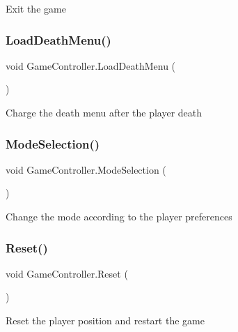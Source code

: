 Exit the game \mbox{\label{class_game_controller_ad6e73ede9ce6222e8cfd5369ef87b04e}} 
\subsubsection{\texorpdfstring{Load\+Death\+Menu()}{LoadDeathMenu()}}
{\footnotesize\ttfamily void Game\+Controller.\+Load\+Death\+Menu (\begin{DoxyParamCaption}{ }\end{DoxyParamCaption})}

Charge the death menu after the player death \mbox{\label{class_game_controller_a99b8c25fe75a7f72c919b6670122c342}} 
\subsubsection{\texorpdfstring{Mode\+Selection()}{ModeSelection()}}
{\footnotesize\ttfamily void Game\+Controller.\+Mode\+Selection (\begin{DoxyParamCaption}{ }\end{DoxyParamCaption})\hspace{0.3cm}{\ttfamily [private]}}

Change the mode according to the player preferences \mbox{\label{class_game_controller_a3cd671c32f42d6d53b040a73af63aeda}} 
\subsubsection{\texorpdfstring{Reset()}{Reset()}}
{\footnotesize\ttfamily void Game\+Controller.\+Reset (\begin{DoxyParamCaption}{ }\end{DoxyParamCaption})}

Reset the player position and restart the game \mbox{\label{class_game_controller_a97788a7aa0f09c8d748781683e5f045b}} 
